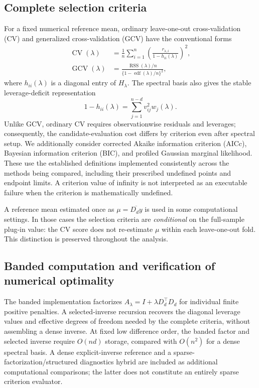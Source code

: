 \subsection{Complete selection criteria}
For a fixed numerical reference mean, ordinary leave-one-out cross-validation (CV) and generalized cross-validation (GCV) have the conventional forms
\begin{align}
\operatorname{CV}(\lambda)
&=\frac1n\sum_{i=1}^n
\left(\frac{r_{\lambda,i}}{1-h_{ii}(\lambda)}\right)^2,
\label{eq:cv}\\
\operatorname{GCV}(\lambda)
&=\frac{\operatorname{RSS}(\lambda)/n}
{\{1-\operatorname{edf}(\lambda)/n\}^2},
\label{eq:gcv}
\end{align}
where $h_{ii}(\lambda)$ is a diagonal entry of $H_\lambda$. The spectral basis also gives the stable leverage-deficit representation
\begin{equation}\label{eq:leverage}
1-h_{ii}(\lambda)=
\sum_{j=1}^{n-d}v_{ij}^2w_j(\lambda).
\end{equation}
Unlike GCV, ordinary CV requires observationwise residuals and leverages; consequently, the candidate-evaluation cost differs by criterion even after spectral setup. We additionally consider corrected Akaike information criterion (AICc), Bayesian information criterion (BIC), and profiled Gaussian marginal likelihood. These use the established definitions implemented consistently across the methods being compared, including their prescribed undefined points and endpoint limits. A criterion value of infinity is not interpreted as an executable failure when the criterion is mathematically undefined.

A reference mean estimated once as $\mu=\overline{D_dy}$ is used in some computational settings. In those cases the selection criteria are \emph{conditional} on the full-sample plug-in value: the CV score does not re-estimate $\mu$ within each leave-one-out fold. This distinction is preserved throughout the analysis.

\subsection{Banded computation and verification of numerical optimality}
The banded implementation factorizes
$A_\lambda=I+\lambda D_d^\top D_d$ for individual finite positive
penalties. A selected-inverse recursion recovers the diagonal
leverage values and effective degrees of freedom needed by the
complete criteria, without assembling a dense inverse. At fixed low
difference order, the banded factor and selected inverse require
$O(nd)$ storage, compared with $O(n^2)$ for a dense spectral basis.
A dense explicit-inverse reference and a sparse-factorization/structured
diagnostics hybrid are included as additional computational comparisons;
the latter does not constitute an entirely sparse criterion evaluator.

